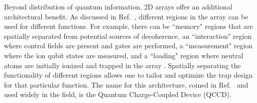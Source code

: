 \documentclass[%
reprint,
 amsmath,amssymb,
]{revtex4-1}
\begin{document}
Beyond distribution of quantum information, 2D arrays offer an additional architectural benefit. As discussed in Ref.~\cite{KielpinskiQCArchitecture2002}, different regions in the array can be used for different functions.  For example, there can be ``memory" regions that are spatially separated from potential sources of decoherence, an ``interaction" region where control fields are present and gates are performed, a ``measurement" region where the ion qubit states are measured, and a ``loading" region where neutral atoms are initially ionized and trapped in the array \cite{LekitscheMicrowaveBlueprint2017}.  Spatially separating the functionality of different regions allows one to tailor and optimize the trap design for that particular function. The name for this architecture, coined in Ref.~\cite{KielpinskiQCArchitecture2002} and used widely in the field, is the Quantum Charge-Coupled Device (QCCD).
\end{document}
